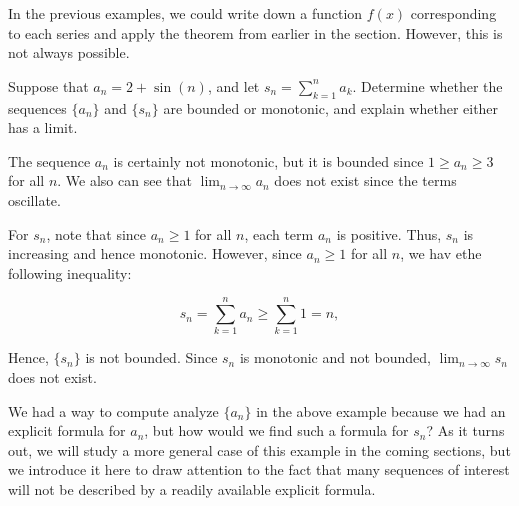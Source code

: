 \documentclass{ximera}
\begin{document}
In the previous examples, we could write down a function $f(x)$ corresponding to each series and apply the theorem from earlier in the section.  However, this is not always possible.

\begin{example}
Suppose that $a_n = 2 + \sin(n)$, and let $s_n = \sum_{k=1}^{n} a_k$.  Determine whether the sequences $\{a_n\}$ and $\{s_n\}$ are bounded or monotonic, and explain whether either has a limit.

\begin{explanation}
The sequence $a_n$ is certainly not monotonic, but it  is bounded since $1 \geq a_n \geq 3$ for all $n$.  We also can see that $\lim_{n \to \infty} a_n$ does not exist since the terms oscillate.

For $s_n$, note that since $a_n \geq 1$ for all $n$, each term $a_n$ is positive.  Thus, $s_n$ is increasing and hence monotonic.  However, since $a_n\geq1$ for all $n$, we hav ethe following inequality:

\[s_n = \sum_{k=1}^n a_n \geq \sum_{k=1}^n 1 = n,\]

Hence, $\{s_n\}$ is not bounded.  Since $s_n$ is monotonic and not bounded, $\lim_{n \to \infty} s_n$ does not exist.
\end{explanation}
\end{example}

\begin{remark}
We had a way to compute analyze $\{a_n\}$ in the above example because we had an explicit formula for $a_n$, but how would we find such a formula for $s_n$?  As it turns out, we will study a more general case of this example in the coming sections, but we introduce it here to draw attention to the fact that many sequences of interest will not be described by a readily available explicit formula. 
\end{remark}
\end{document}
